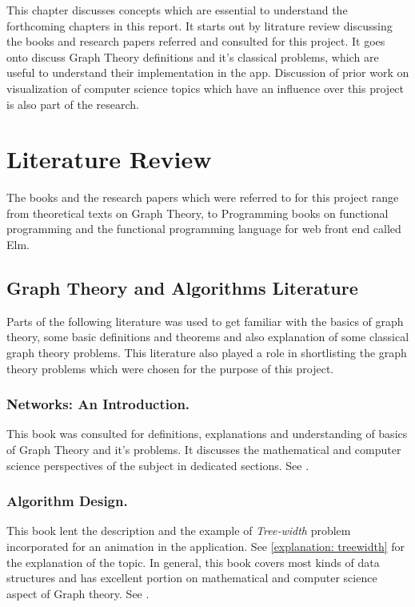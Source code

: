 
This chapter discusses concepts which are essential to understand the
forthcoming chapters in this report. It starts out by litrature review
discussing the books and research papers referred and consulted for this
project. It goes onto discuss Graph Theory definitions and it's classical
problems, which are useful to understand their implementation in the app.
Discussion of prior work on visualization of computer science topics which have
an influence over this project is also part of the research.

\section{Literature Review}
The books and the research papers which were referred to for this project range
from theoretical texts on Graph Theory, to Programming books on functional
programming and the functional programming language for web front end called
Elm.

\subsection{Graph Theory and Algorithms Literature}
Parts of the following literature was used to get familiar with the
basics of graph theory, some basic definitions and theorems and also
explanation of some classical graph theory problems. This literature
also played a role in shortlisting the graph theory problems which  
were chosen for the purpose of this project.
\subsubsection{Networks: An Introduction.}
This book was consulted for definitions, explanations and understanding of
basics of Graph Theory and it's problems. It discusses the mathematical and
computer science perspectives of the subject in dedicated sections. See \cite{Newman10}.
\subsubsection{Algorithm Design.}
This book lent the description and the example of \emph{Tree-width} problem
incorporated for an animation in the application.  See \autoref{explanation:
treewidth} for the explanation of the topic. In general, this book covers most
kinds of data structures and has excellent portion on mathematical and
computer science aspect of Graph theory. See \cite{KleinbergTardos06}.

